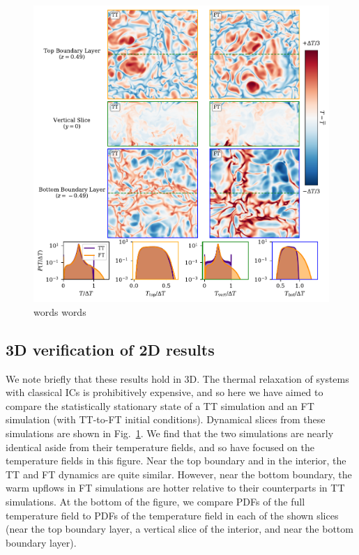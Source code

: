 \documentclass[aps, pre, onecolumn, nofootinbib, notitlepage, groupedaddress, amsfonts, amssymb, amsmath, longbibliography, superscriptaddress]{revtex4-1}
\newcommand{\ea}[1]{{\color{red} #1}}
\begin{document}
\begin{figure}[p!]
\includegraphics[width=\textwidth]{./figs/rbc_3D_panels.pdf}
\caption{ 
	words
	words
	\label{fig:rbc_3D_panels} }
\end{figure}

\ea{
\subsection{3D verification of 2D results}
We note briefly that these results hold in 3D.
The thermal relaxation of systems with classical ICs is prohibitively expensive, and so here we have aimed to compare the statistically stationary state of a TT simulation and an FT simulation (with TT-to-FT initial conditions).
Dynamical slices from these simulations are shown in Fig.~\ref{fig:rbc_3D_panels}.
We find that the two simulations are nearly identical aside from their temperature fields, and so have focused on the temperature fields in this figure.
Near the top boundary and in the interior, the TT and FT dynamics are quite similar.
However, near the bottom boundary, the warm upflows in FT simulations are hotter relative to their counterparts in TT simulations.
At the bottom of the figure, we compare PDFs of the full temperature field to PDFs of the temperature field in each of the shown slices (near the top boundary layer, a vertical slice of the interior, and near the bottom boundary layer).
}
\end{document}
